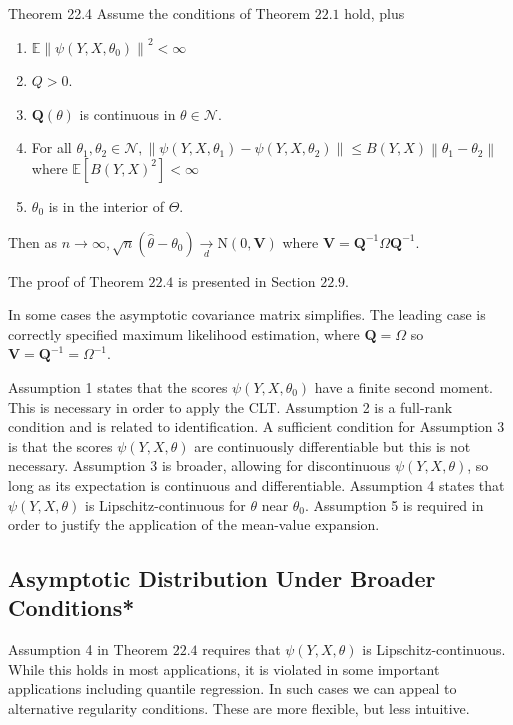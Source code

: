\documentclass[10pt]{article}
\begin{document}
Theorem 22.4 Assume the conditions of Theorem $22.1$ hold, plus

\begin{enumerate}
  \item $\mathbb{E}\left\|\psi\left(Y, X, \theta_{0}\right)\right\|^{2}<\infty$

  \item $Q>0$.

  \item $\boldsymbol{Q}(\theta)$ is continuous in $\theta \in \mathscr{N}$.

  \item For all $\theta_{1}, \theta_{2} \in \mathcal{N},\left\|\psi\left(Y, X, \theta_{1}\right)-\psi\left(Y, X, \theta_{2}\right)\right\| \leq B(Y, X)\left\|\theta_{1}-\theta_{2}\right\|$ where $\mathbb{E}\left[B(Y, X)^{2}\right]<\infty$

  \item $\theta_{0}$ is in the interior of $\Theta$.

\end{enumerate}
Then as $n \rightarrow \infty, \sqrt{n}\left(\widehat{\theta}-\theta_{0}\right) \underset{d}{\longrightarrow} \mathrm{N}(0, \boldsymbol{V})$ where $\boldsymbol{V}=\boldsymbol{Q}^{-1} \Omega \boldsymbol{Q}^{-1}$.

The proof of Theorem $22.4$ is presented in Section $22.9$.

In some cases the asymptotic covariance matrix simplifies. The leading case is correctly specified maximum likelihood estimation, where $\boldsymbol{Q}=\Omega$ so $\boldsymbol{V}=\boldsymbol{Q}^{-1}=\Omega^{-1}$.

Assumption 1 states that the scores $\psi\left(Y, X, \theta_{0}\right)$ have a finite second moment. This is necessary in order to apply the CLT. Assumption 2 is a full-rank condition and is related to identification. A sufficient condition for Assumption 3 is that the scores $\psi(Y, X, \theta)$ are continuously differentiable but this is not necessary. Assumption 3 is broader, allowing for discontinuous $\psi(Y, X, \theta)$, so long as its expectation is continuous and differentiable. Assumption 4 states that $\psi(Y, X, \theta)$ is Lipschitz-continuous for $\theta$ near $\theta_{0}$. Assumption 5 is required in order to justify the application of the mean-value expansion.

\subsection{Asymptotic Distribution Under Broader Conditions*}
Assumption 4 in Theorem $22.4$ requires that $\psi(Y, X, \theta)$ is Lipschitz-continuous. While this holds in most applications, it is violated in some important applications including quantile regression. In such cases we can appeal to alternative regularity conditions. These are more flexible, but less intuitive.
\end{document}
